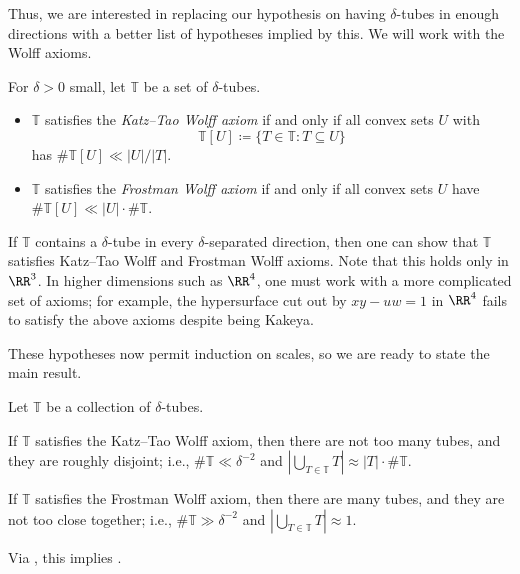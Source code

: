 \documentclass{article}
\begin{document}
Thus, we are interested in replacing our hypothesis on having $\delta$-tubes in enough directions with a better list of hypotheses implied by this. We will work with the Wolff axioms.
\begin{definition}
	For $\delta>0$ small, let $\mathbb T$ be a set of $\delta$-tubes.
	\begin{itemize}
		\item $\mathbb T$ satisfies the \textit{Katz--Tao Wolff axiom} if and only if all convex sets $U$ with
		\[\mathbb T[U]\coloneqq\{T\in\mathbb T:T\subseteq U\}\]
		has $\#\mathbb T[U]\ll\left|U\right|/\left|T\right|$.
		\item $\mathbb T$ satisfies the \textit{Frostman Wolff axiom} if and only if all convex sets $U$ have $\#\mathbb T[U]\ll\left|U\right|\cdot\#\mathbb T$.
	\end{itemize}
\end{definition}
\begin{remark} \label{rem:kakeya-to-wolff}
	If $\mathbb T$ contains a $\delta$-tube in every $\delta$-separated direction, then one can show that $\mathbb T$ satisfies Katz--Tao Wolff and Frostman Wolff axioms. Note that this holds only in $\RR^3$. In higher dimensions such as $\RR^4$, one must work with a more complicated set of axioms; for example, the hypersurface cut out by $xy-uw=1$ in $\RR^4$ fails to satisfy the above axioms despite being Kakeya.
\end{remark}
These hypotheses now permit induction on scales, so we are ready to state the main result.
\begin{theorem} \label{thm:get-kakeya}
	Let $\mathbb T$ be a collection of $\delta$-tubes.
	\begin{listalph}
		\item If $\mathbb T$ satisfies the Katz--Tao Wolff axiom, then there are not too many tubes, and they are roughly disjoint; i.e., $\#\mathbb T\ll\delta^{-2}$ and $\left|\bigcup_{T\in\mathbb T}T\right|\approx\left|T\right|\cdot\#\mathbb T$.
		\item If $\mathbb T$ satisfies the Frostman Wolff axiom, then there are many tubes, and they are not too close together; i.e., $\#\mathbb T\gg\delta^{-2}$ and $\left|\bigcup_{T\in\mathbb T}T\right|\approx1$.
	\end{listalph}
\end{theorem}
Via , this implies .
\end{document}
